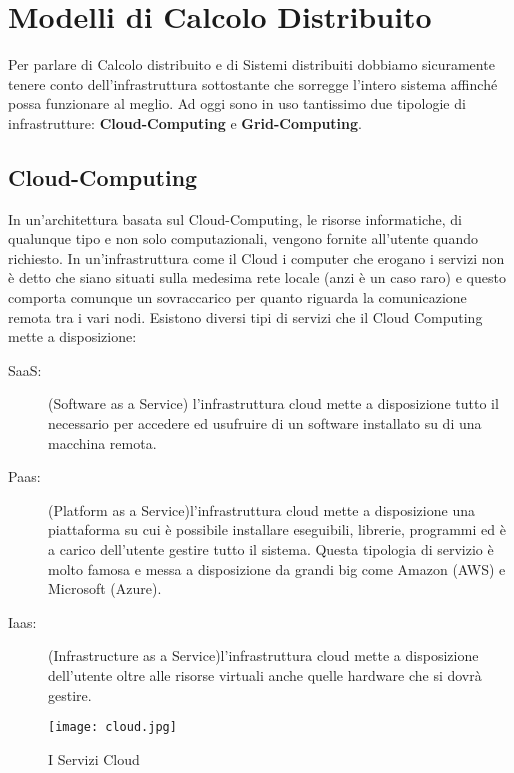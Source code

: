 \section{Modelli di Calcolo Distribuito}
Per parlare di Calcolo distribuito e di Sistemi distribuiti dobbiamo sicuramente tenere conto dell'infrastruttura sottostante che sorregge l'intero sistema affinché possa funzionare al meglio. Ad oggi sono in uso tantissimo due tipologie di infrastrutture: \textbf{Cloud-Computing} e \textbf{Grid-Computing}.
\subsection{Cloud-Computing}
In un'architettura basata sul Cloud-Computing, le risorse informatiche, di qualunque tipo e non solo computazionali, vengono fornite all'utente quando richiesto. In un'infrastruttura come il Cloud i computer che erogano i servizi non è detto che siano situati sulla medesima rete locale (anzi è un caso raro) e questo comporta comunque un sovraccarico per quanto riguarda la comunicazione remota tra i vari nodi. Esistono diversi tipi di servizi che il Cloud Computing mette a disposizione:
\begin{description}
     \item[SaaS:] (Software as a Service) l'infrastruttura cloud mette a disposizione tutto il necessario per accedere ed usufruire di un software installato su di una macchina remota.
     \item[Paas:] (Platform as a Service)l'infrastruttura cloud mette a disposizione una piattaforma su cui è possibile installare eseguibili, librerie, programmi ed è a carico dell'utente gestire tutto il sistema. Questa tipologia di servizio è molto famosa e messa a disposizione da grandi big come Amazon (AWS) e Microsoft (Azure).
     \item[Iaas:] (Infrastructure as a Service)l'infrastruttura cloud mette a disposizione dell'utente oltre alle risorse virtuali anche quelle hardware che si dovrà gestire. 
   \end{description}   
\begin{figure}[!ht]
  \begin{center}
    \texttt{[image: cloud.jpg]}
    \caption{I Servizi Cloud}
    \label{fig:cloud}
  \end{center}
\end{figure}
